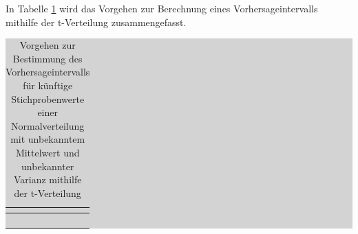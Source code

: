 \noindent In Tabelle \ref{tab:fiveeighteen} wird das Vorgehen zur Berechnung eines Vorhersageintervalls mithilfe der t-Verteilung zusammengefasst.

\begin{table}[H]
\setlength{\arrayrulewidth}{.1em}
\caption{Vorgehen zur Bestimmung des Vorhersageintervalls f\"{u}r k\"{u}nftige Stichprobenwerte einer Normalverteilung mit unbekanntem Mittelwert und unbekannter Varianz mithilfe der t-Verteilung}
\setlength{\fboxsep}{0pt}%
\colorbox{lightgray}{%
%
\begin{tabular}{| c | c |}
\hline
\parbox[c][0.3in][c]{0.4in}{\smallskip\centering\textbf{\selectfont{Nr.}}} & 
\parbox[c][0.3in][c]{6.2in}{\smallskip\centering\textbf{\selectfont{Prozessschritt}}}\\ \hline

\parbox[c][0.3in][c]{0.4in}{\centering{}\selectfont{1}} & 
\parbox[c][0.3in][c]{6.2in}{\centering{}\selectfont{Wahl einer Konfidenzzahl $\gamma$}}\\ \hline

\parbox[c][0.9in][c]{0.4in}{\centering{}\selectfont{2}} & 
\parbox[c][0.9in][c]{6.2in}{\centering{}}\\ \hline

\parbox[c][0.9in][c]{0.4in}{\centering{}\selectfont{3}} & 
\parbox[c][0.9in][c]{6.2in}{\centering{}}\\ \hline

\parbox[c][0.9in][c]{0.4in}{\centering{}\selectfont{4}} & 
\parbox[c][0.9in][c]{6.2in}{\centering{}}\\ \hline

\end{tabular}%
}
\label{tab:fiveeighteen}
\end{table}

